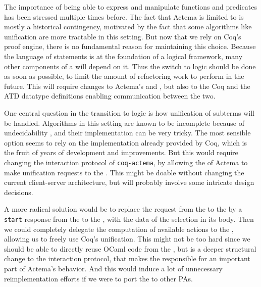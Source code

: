 The importance of being able to express and manipulate  functions
and predicates has been stressed multiple times before. The fact that Actema is
limited to  is mostly a historical contingency, motivated by
the fact that some algorithms like unification are more tractable in this
setting. But now that we rely on Coq's proof engine, there is no fundamental
reason for maintaining this choice. Because the language of statements is at the
foundation of a logical framework, many other components of a 
will depend on it. Thus the switch to  logic should be done as soon
as possible, to limit the amount of refactoring work to perform in the future.
This will require changes to Actema's  and ,
but also to the Coq  and the ATD datatype definitions enabling
communication between the two.

One central question in the transition to  logic is how unification
of subterms will be handled. Algorithms in this setting are known to be
incomplete because of undecidability , and
their implementation can be very tricky. The most sensible option seems to rely
on the implementation already provided by Coq, which is the fruit of years of
development and improvements. But this would require changing the interaction
protocol of \texttt{coq-actema}, by allowing the  of Actema to
make unification requests to the . This might be doable without
changing the current client-server architecture, but will probably involve some
intricate design decisions.

A more radical solution would be to replace the  request from
the  to the  by a \texttt{start} response
from the  to the , with the data of the
selection in its body. Then we could completely delegate the computation of
available actions to the , allowing us to freely use Coq's
unification. This might not be too hard since we should be able to directly
reuse OCaml code from the , but is a deeper structural change
to the interaction protocol, that makes the  responsible for an
important part of Actema's behavior. And this would induce a lot of unnecessary
reimplementation efforts if we were to port the  to other PAs.

